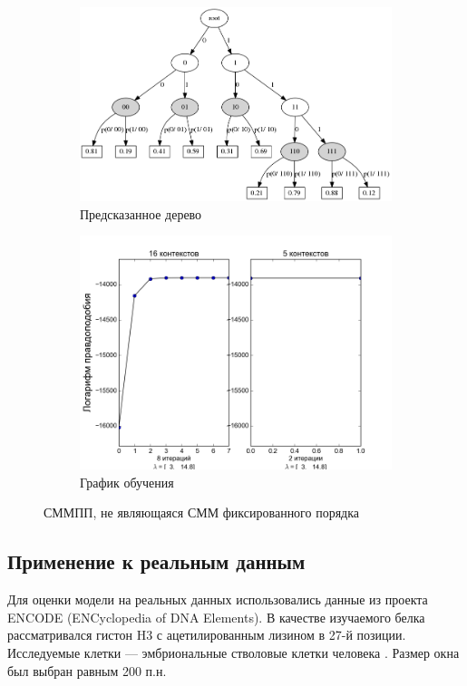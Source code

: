 \documentclass{matmex-diploma-custom}
\begin{document}
\begin{figure}[h!]
\begin{subfigure}[b]{0.49 \textwidth}
\end{subfigure}
\hfil \hfil%
\begin{subfigure}[b]{0.49 \textwidth}
	\includegraphics[scale=0.3]{img/sample/predicted_trie.png}
	\centering
	\caption{ Предсказанное дерево }
	\label{fig:sample_vlhmm_predicted_trie}
\end{subfigure}
\begin{subfigure}[b]{0.8 \textwidth}
	\includegraphics[scale=0.38]{img/sample/plot_.png}
	\centering
	\caption{ График обучения }
	\label{fig:sample_vlhmm_log_likelihood}
\end{subfigure}
\caption{ СММПП, не являющаяся СММ фиксированного порядка }
\label{fig:sample_vlhmm}
\end{figure}

\subsection{Применение к реальным данным}
Для оценки модели на реальных данных использовались данные из проекта ENCODE (ENCyclopedia of DNA Elements).
В качестве изучаемого белка рассматривался гистон H3 с ацетилированным лизином в 27-й позиции. Исследуемые клетки --- эмбриональные стволовые клетки человека \cite{ENCODE}.
Размер окна был выбран равным 200 п.н.
\end{document}
